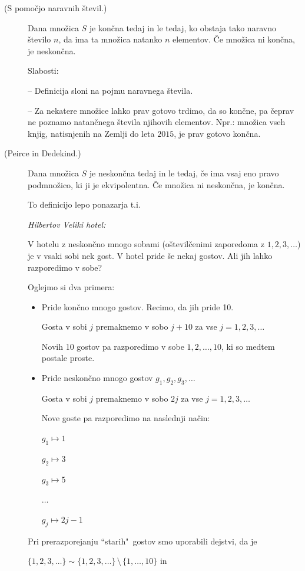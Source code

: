 \documentclass[11pt,paper=b5,DIV=13,headinclude,footinclude]{scrbook}
\def\brez {{\,\setminus\,}}
\begin{document}
\begin{description}
  \item[(S pomočjo naravnih števil.)] Dana množica $S$ je končna tedaj in le tedaj, ko obstaja tako naravno število $n$, da ima ta množica natanko $n$ elementov. Če množica ni končna, je neskončna.

      Slabosti:

      -- Definicija sloni na pojmu naravnega števila.

      -- Za nekatere množice lahko prav gotovo trdimo, da so končne, pa čeprav ne poznamo natančnega števila njihovih elementov. Npr.: množica vseh knjig, natisnjenih na Zemlji do leta $2015$, je prav gotovo končna.

  \item[(Peirce in Dedekind.)] Dana množica $S$ je neskončna tedaj in le tedaj, če ima vsaj
  eno pravo podmnožico, ki ji je ekvipolentna. Če množica ni neskončna, je končna.

  \medskip
  To definicijo lepo ponazarja t.i.~{\em Hilbertov Veliki hotel:

  V hotelu z neskončno mnogo sobami (oštevilčenimi zaporedoma z $1,2,3,\ldots$) je v vsaki sobi nek gost. V hotel pride še nekaj gostov. Ali jih lahko razporedimo v sobe?}

  Oglejmo si dva primera:
\begin{itemize}
  \item {Pride končno mnogo gostov.} Recimo, da jih pride 10.

  Gosta v sobi $j$ premaknemo v sobo $j+10$ za vse $j = 1,2,3,\ldots$

  Novih 10 gostov pa razporedimo v sobe $1,2,\ldots, 10$, ki so medtem postale proste.

  \item {Pride neskončno mnogo gostov $g_1, g_2, g_3,\ldots$}

  Gosta v sobi $j$ premaknemo v sobo $2j$ za vse $j = 1,2,3,\ldots$

  Nove goste pa razporedimo na naslednji način:

  $g_1\mapsto 1$

  $g_2\mapsto 3$

  $g_3\mapsto 5$

  $\ldots$

  $g_j\mapsto 2j-1$
\end{itemize}


  Pri prerazporejanju ``starih"~gostov smo uporabili dejstvi, da je

  $\{1,2,3,\ldots\}\sim\{1,2,3,\ldots\}\brez\{1,\ldots,10\}$ in


\end{description}
\end{document}
